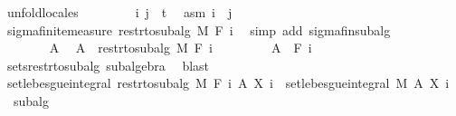 \begin{isabellebody}
%
\isadelimproof
%
\endisadelimproof
%
\isatagproof
{}\isamarkupfalse%
\ {\isacharparenleft}{\kern0pt}unfold{\isacharunderscore}{\kern0pt}locales{\isacharparenright}{\kern0pt}\isanewline
\ \ \isacommand{{\isacharbraceleft}{\kern0pt}}\isamarkupfalse%
\isanewline
\ \ \ \ \isamarkupfalse%
\ i\ j\ {\isacharcolon}{\kern0pt}{\isacharcolon}{\kern0pt}\ {\isacharprime}{\kern0pt}t\ \isamarkupfalse%
\ asm{\isacharcolon}{\kern0pt}\ {\isachardoublequoteopen}i\ {\isasymle}\ j{\isachardoublequoteclose}\isanewline
\ \ \ \ \isamarkupfalse%
\ sigma{\isacharunderscore}{\kern0pt}finite{\isacharunderscore}{\kern0pt}measure\ {\isachardoublequoteopen}restr{\isacharunderscore}{\kern0pt}to{\isacharunderscore}{\kern0pt}subalg\ M\ {\isacharparenleft}{\kern0pt}F\ i{\isacharparenright}{\kern0pt}{\isachardoublequoteclose}\ \isamarkupfalse%
\ {\isacharparenleft}{\kern0pt}simp\ add{\isacharcolon}{\kern0pt}\ sigma{\isacharunderscore}{\kern0pt}fin{\isacharunderscore}{\kern0pt}subalg{\isacharparenright}{\kern0pt}\isanewline
\ \ \ \ \isacommand{{\isacharbraceleft}{\kern0pt}}\isamarkupfalse%
\isanewline
\ \ \ \ \ \ \isamarkupfalse%
\ A\ \isamarkupfalse%
\ {\isachardoublequoteopen}A\ {\isasymin}\ restr{\isacharunderscore}{\kern0pt}to{\isacharunderscore}{\kern0pt}subalg\ M\ {\isacharparenleft}{\kern0pt}F\ i{\isacharparenright}{\kern0pt}{\isachardoublequoteclose}\isanewline
\ \ \ \ \ \ \isamarkupfalse%
\ {\isacharasterisk}{\kern0pt}{\isacharcolon}{\kern0pt}\ {\isachardoublequoteopen}A\ {\isasymin}\ F\ i{\isachardoublequoteclose}\ \isamarkupfalse%
\ sets{\isacharunderscore}{\kern0pt}restr{\isacharunderscore}{\kern0pt}to{\isacharunderscore}{\kern0pt}subalg\ subalgebra\ \isamarkupfalse%
\ blast\isanewline
\ \ \ \ \ \ \isamarkupfalse%
\ {\isachardoublequoteopen}set{\isacharunderscore}{\kern0pt}lebesgue{\isacharunderscore}{\kern0pt}integral\ {\isacharparenleft}{\kern0pt}restr{\isacharunderscore}{\kern0pt}to{\isacharunderscore}{\kern0pt}subalg\ M\ {\isacharparenleft}{\kern0pt}F\ i{\isacharparenright}{\kern0pt}{\isacharparenright}{\kern0pt}\ A\ {\isacharparenleft}{\kern0pt}X\ i{\isacharparenright}{\kern0pt}\ {\isacharequal}{\kern0pt}\ set{\isacharunderscore}{\kern0pt}lebesgue{\isacharunderscore}{\kern0pt}integral\ M\ A\ {\isacharparenleft}{\kern0pt}X\ i{\isacharparenright}{\kern0pt}{\isachardoublequoteclose}\ \isamarkupfalse%
\ {\isacharasterisk}{\kern0pt}\ subalg\ \isamarkupfalse%

\end{isabellebody}
